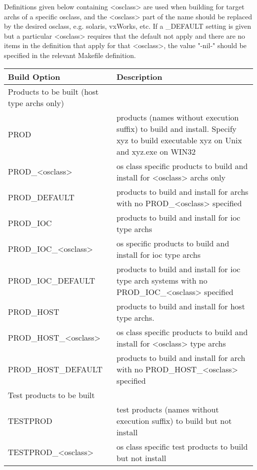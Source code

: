 Definitions given below containing \textless{}osclass\textgreater{} are used when building for target archs of a specific osclass, and the 
\textless{}osclass\textgreater{} part of the name should be replaced by the desired osclass, e.g. solaris, vxWorks, etc. If a \_DEFAULT setting is 
given but a particular \textless{}osclass\textgreater{} requires that the default not apply and there are no items in the definition that apply for 
that \textless{}osclass\textgreater{}, the value "-nil-" should be specified in the relevant Makefile definition.
\begin{center}\begin{longtable}{p{2.94784in}p{3.76247in}}
Build Option & Description\\
\hline
Products to be built (host type archs only) & \\
PROD & products (names without execution suffix) to build and install. Specify xyz to build executable xyz on Unix and xyz.exe on WIN32\\
PROD\_\textless{}osclass\textgreater{} & os class specific products to build and install for \textless{}osclass\textgreater{} archs only\\
PROD\_DEFAULT & products to build and install for archs with no PROD\_\textless{}osclass\textgreater{} specified\\
PROD\_IOC & products to build and install for ioc type archs\\
PROD\_IOC\_\textless{}osclass\textgreater{} & os specific products to build and install for ioc type archs\\
PROD\_IOC\_DEFAULT & products to build and install for ioc type arch systems with no PROD\_IOC\_\textless{}osclass\textgreater{} specified\\
PROD\_HOST & products to build and install for host type archs. \\
PROD\_HOST\_\textless{}osclass\textgreater{} & os class specific products to build and install for \textless{}osclass\textgreater{} type archs\\
PROD\_HOST\_DEFAULT & products to build and install for arch with no PROD\_HOST\_\textless{}osclass\textgreater{} specified\\
Test products to be built & \\
TESTPROD & test products (names without execution suffix) to build but not install \\
TESTPROD\_\textless{}osclass\textgreater{} & os class specific test products to build but not install\\

\end{longtable}
\end{center}
